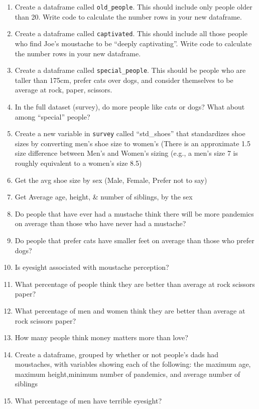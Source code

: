 \documentclass[
]{book}
\begin{document}
\begin{enumerate}
\def\labelenumi{\arabic{enumi})}
\item
  Create a dataframe called \texttt{old\_people}. This should include only people older than 20. Write code to calculate the number rows in your new dataframe.
\item
  Create a dataframe called \texttt{captivated}. This should include all those people who find Joe's moustache to be ``deeply captivating''. Write code to calculate the number rows in your new dataframe.
\item
  Create a dataframe called \texttt{special\_people}. This should be people who are taller than 175cm, prefer cats over dogs, and consider themselves to be average at rock, paper, scissors.
\item
  In the full dataset (survey), do more people like cats or dogs? What about among ``special'' people?
\item
  Create a new variable in \texttt{survey} called ``std\_shoes'' that standardizes shoe sizes by converting men's shoe size to women's (There is an approximate 1.5 size difference between Men's and Women's sizing (e.g., a men's size 7 is roughly equivalent to a women's size 8.5)
\item
  Get the avg shoe size by sex (Male, Female, Prefer not to say)
\item
  Get Average age, height, \& number of siblings, by the sex
\item
  Do people that have ever had a mustache think there will be more pandemics on average than those who have never had a mustache?
\item
  Do people that prefer cats have smaller feet on average than those who prefer dogs?
\item
  Is eyesight associated with moustache perception?
\item
  What percentage of people think they are better than average at rock scissors paper?
\item
  What percentage of men and women think they are better than average at rock scissors paper?
\item
  How many people think money matters more than love?
\item
  Create a dataframe, grouped by whether or not people's dads had moustaches, with variables showing each of the following: the maximum age, maximum height,minimum number of pandemics, and average number of siblings
\item
  What percentage of men have terrible eyesight?

\end{enumerate}
\end{document}
